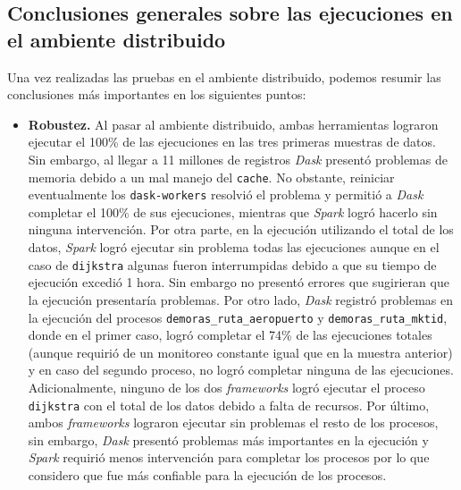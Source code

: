 \subsection{Conclusiones generales sobre las ejecuciones en el ambiente distribuido}

Una vez realizadas las pruebas en el ambiente distribuido, podemos resumir las conclusiones más importantes en los siguientes puntos:

\begin{itemize}
	
	\item \textbf{Robustez.} Al pasar al ambiente distribuido, ambas herramientas lograron ejecutar el 100\% de las ejecuciones en las tres primeras muestras de datos. Sin embargo, al llegar a 11 millones de registros \textit{Dask} presentó problemas de memoria debido a un mal manejo del \texttt{cache}. No obstante, reiniciar eventualmente los \texttt{dask-workers} resolvió el problema y permitió a \textit{Dask} completar el 100\% de sus ejecuciones, mientras que \textit{Spark} logró hacerlo sin ninguna intervención. Por otra parte, en la ejecución utilizando el total de los datos, \textit{Spark} logró ejecutar sin problema todas las ejecuciones aunque en el caso de \texttt{dijkstra} algunas fueron interrumpidas debido a que su tiempo de ejecución excedió 1 hora. Sin embargo no presentó errores que sugirieran que la ejecución presentaría problemas. Por otro lado, \textit{Dask} registró problemas en la ejecución del procesos \texttt{demoras\_ruta\_aeropuerto} y \texttt{demoras\_ruta\_mktid}, donde en el primer caso, logró completar el 74\% de las ejecuciones totales (aunque requirió de un monitoreo constante igual que en la muestra anterior) y en caso del segundo proceso, no logró completar ninguna de las ejecuciones. Adicionalmente, ninguno de los dos \textit{frameworks} logró ejecutar el proceso \texttt{dijkstra} con el total de los datos debido a falta de recursos. Por último, ambos \textit{frameworks} lograron ejecutar sin problemas el resto de los procesos, sin embargo, \textit{Dask} presentó problemas más importantes en la ejecución y \textit{Spark} requirió menos intervención para completar los procesos por lo que considero que fue más confiable para la ejecución de los procesos.
	

\end{itemize}
